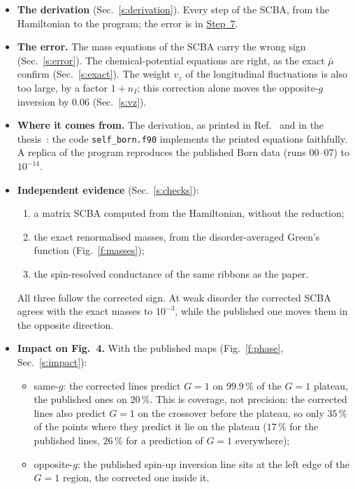 \documentclass[11pt,a4paper]{article}
\begin{document}
\begin{itemize}
\item \textbf{The derivation} (Sec.~\ref{s:derivation}). Every step of the SCBA, from the
  Hamiltonian to the program; the error is in \hyperref[st:identify]{Step~7}.
\item \textbf{The error.} The mass equations of the SCBA carry the wrong sign
  (Sec.~\ref{s:error}). The chemical-potential equations are right, as the exact $\bar\mu$
  confirm (Sec.~\ref{s:exact}). The weight $v_z$ of the longitudinal fluctuations is also too
  large, by a factor $1+n_I$; this correction alone moves the opposite-$g$ inversion by $0.06$
  (Sec.~\ref{s:vz}).
\item \textbf{Where it comes from.} The derivation, as printed in Ref.~\cite{g2g1} and in
  the thesis~\cite{thesis}: the code \texttt{self\_born.f90} implements the printed equations
  faithfully. A replica of the program reproduces the published Born data (runs 00--07) to
  $10^{-14}$.
\item \textbf{Independent evidence} (Sec.~\ref{s:checks}):
  \begin{enumerate}
  \item a matrix SCBA computed from the Hamiltonian, without the reduction;
  \item the exact renormalised masses, from the disorder-averaged Green's function
    (Fig.~\ref{f:masses});
  \item the spin-resolved conductance of the same ribbons as the paper.
  \end{enumerate}
  All three follow the corrected sign. At weak disorder the corrected SCBA agrees with the exact
  masses to $10^{-3}$, while the published one moves them in the opposite direction.
\item \textbf{Impact on Fig.~4.} With the published maps (Fig.~\ref{f:phase},
  Sec.~\ref{s:impact}):
  \begin{itemize}
  \item same-$g$: the corrected lines predict $G=1$ on $99.9\,\%$ of the $G=1$ plateau, the
    published ones on $20\,\%$. This is coverage, not precision: the corrected lines also
    predict $G=1$ on the crossover before the plateau, so only $35\,\%$ of the points where they
    predict it lie on the plateau ($17\,\%$ for the published lines, $26\,\%$ for a prediction of
    $G=1$ everywhere);
  \item opposite-$g$: the published spin-up inversion line sits at the left edge of the $G=1$
    region, the corrected one inside it.

\end{itemize}
\end{itemize}
\end{document}
